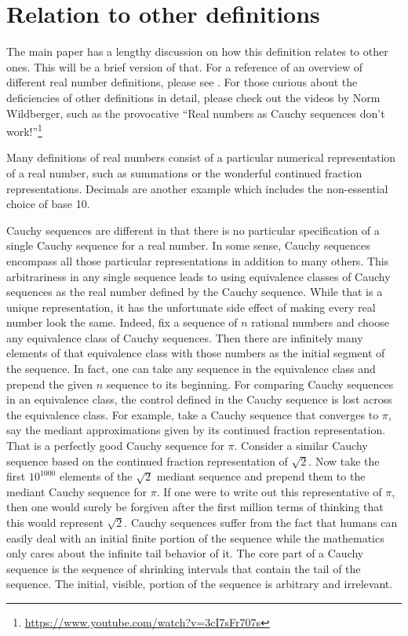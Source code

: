 \documentclass[12pt]{article}
\begin{document}
\section{Relation to other definitions}

The main paper has a lengthy discussion on how this definition relates to other ones. This will be a brief version of that. For a reference of an overview of different real number definitions, please see \cite{ittay-2015}. For those curious about the deficiencies of other definitions in detail, please check out the videos by Norm Wildberger, such as the provocative ``Real numbers as Cauchy sequences don't work!''\footnote{\url{https://www.youtube.com/watch?v=3cI7sFr707s}} 

Many definitions of real numbers consist of a particular numerical representation of a real number, such as summations or the wonderful continued fraction representations. Decimals are another example which includes the non-essential choice of base 10. 

Cauchy sequences are different in that there is no particular specification of a single Cauchy sequence for a real number. In some sense, Cauchy sequences encompass all those particular representations in addition to many others. This arbitrariness in any single sequence leads to using equivalence classes of Cauchy sequences as the real number defined by the Cauchy sequence. While that is a unique representation, it has the unfortunate side effect of making every real number look the same. Indeed, fix a sequence of $n$ rational numbers and choose any equivalence class of Cauchy sequences. Then there are infinitely many elements of that equivalence class with those numbers as the initial segment of the sequence. In fact, one can take any sequence in the equivalence class and prepend the given $n$ sequence to its beginning.  For comparing Cauchy sequences in an equivalence class, the control defined in the Cauchy sequence is lost across the equivalence class. For example, take a Cauchy sequence that converges to $\pi$, say the mediant approximations given by its continued fraction representation. That is a perfectly good Cauchy sequence for $\pi$. Consider a similar Cauchy sequence based on the continued fraction representation of $\sqrt{2}$.  Now take the first $10^{1000}$ elements of the $\sqrt{2}$ mediant sequence and prepend them to  the mediant Cauchy sequence for $\pi$. If one were to write out this representative of $\pi$, then one would surely be forgiven after the first million terms of thinking that this would represent $\sqrt{2}$. Cauchy sequences suffer from the fact that humans can easily deal with an initial finite portion of the sequence while the mathematics only cares about the infinite tail behavior of it. The core part of a Cauchy sequence is the sequence of shrinking intervals that contain the tail of the sequence. The initial, visible, portion of the sequence is arbitrary and irrelevant.  
\end{document}

